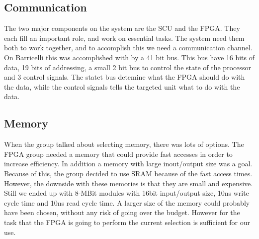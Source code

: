 
\subsection{Communication} \label{pcb:design-choices:ss:internal_communication}

The two major components on the system are the SCU and the FPGA.
They each fill an important role, and work on essential tasks.
The system need them both to work together, and to accomplish this we need a communication channel.
On Barricelli this was accomplished with by a 41 bit bus.
This bus have 16 bits of data, 19 bits of addressing, a small 2 bit bus to control the state of the processor and 3 control signals.
The statet bus detemine what the FPGA should do with the data, while the control signals tells the targeted unit what to do with the data. 



\subsection{Memory} \label{pcb:design-choices:ss:memory}
When the group talked about selecting memory, there was lots of options.
The FPGA group needed a memory that could provide fast accesses in order to increase efficiency.
In addition a memory with large inout/output size was a goal.
Because of this, the group decided to use SRAM because of the fast access times.
However, the downside with these memories is that they are small and expensive.
Still we ended up with 8-MBit modules with 16bit input/output size, 10ns write cycle time and 10ns read cycle time.
A larger size of the memory could probably have been chosen, without any risk of going over the budget.
However for the task that the FPGA is going to perform the current selection is sufficient for our use.

